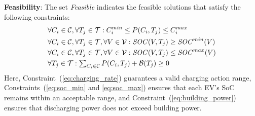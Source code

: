 \noindent \textbf{Feasibility}:
The set \textit{Feasible} indicates the feasible solutions that satisfy the following constraints:
\begin{align}
    & \forall C_i \in \mathcal{C}, \forall T_j \in \mathcal{T}: C_i^{min} \leq P(C_i, T_j) \leq C_i^{max} \label{eq:charging_rate} \\
    & \forall C_i \in \mathcal{C}, \forall T_j \in \mathcal{T}, \forall V \in \mathcal{V}: {\it SOC}(V, T_j) \geq {{\it SOC}^{min}}(V)\label{eq:soc_min} \\
    & \forall C_i \in \mathcal{C}, \forall T_j \in \mathcal{T}, \forall V \in \mathcal{V}: {\it SOC}(V, T_j)\leq {{\it SOC}^{max}}(V)\label{eq:soc_max} \\
    & \forall T_j \in \mathcal{T}: \textstyle\sum_{C_i \in \mathcal{C}} P(C_i, T_j) + \mathcal{B}(T_j) \geq 0  \label{eq:building_power}     
\end{align} 
Here, Constraint~(\ref{eq:charging_rate}) guarantees a valid charging action range, Constraints~(\ref{eq:soc_min} and \ref{eq:soc_max}) ensures that each EV's SoC remains within an acceptable range, and Constraint~(\ref{eq:building_power}) ensures that discharging power does not exceed building power. 




